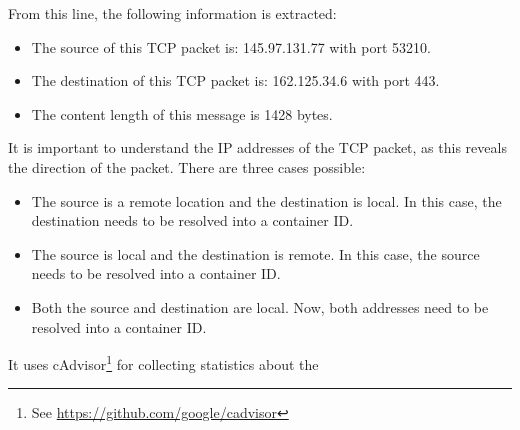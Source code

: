 From this line, the following information is extracted:
\begin{itemize}
    \item The source of this TCP packet is: 145.97.131.77 with port 53210.
    \item The destination of this TCP packet is: 162.125.34.6 with port 443.
    \item The content length of this message is 1428 bytes.
\end{itemize}
It is important to understand the IP addresses of the TCP packet, as this reveals the direction of the packet. There are three cases possible:
\begin{itemize}
    \item The source is a remote location and the destination is local. In this case, the destination needs to be resolved into a container ID.
    \item The source is local and the destination is remote. In this case, the source needs to be resolved into a container ID.
    \item Both the source and destination are local. Now, both addresses need to be resolved into a container ID.
\end{itemize}


It uses cAdvisor\footnote{See \url{https://github.com/google/cadvisor}} for collecting statistics about the 
